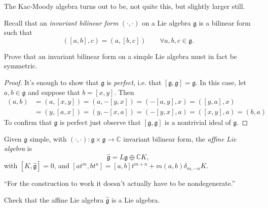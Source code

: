 The Kac-Moody algebra turns out to be, not quite this, but slightly larger
still.

Recall that an {\it invariant bilinear form} $(\cdot,\cdot)$ on a Lie algebra
$\mathfrak{g}$ is a bilinear form such that
\begin{equation}
\label{equation-invariant-bilinear-form}
([a,b],c)=(a,[b,c])\qquad \forall a,b,c \in \mathfrak{g}.
\end{equation}

\begin{exercise}
\label{exercise-invariant-bilinear-form-on-simple-Lie-algebra-is-symmetric}
Prove that an invariant bilinear form on a simple Lie algebra must in fact be
symmetric.
\end{exercise}

\begin{proof}
It's enough to show that $\mathfrak{g}$ is
{\it perfect}, i.e. that $[\mathfrak{g},\mathfrak{g}]=\mathfrak{g}$. In this
case, let $a,b \in \mathfrak{g}$ and suppose that $b=[x,y]$. Then
\begin{align*}
(a,b)&=(a,[x,y])=(a,-[y,x])=(-[a,y],x)=([y,a],x)\\
&=(y,[a,x])=(y,-[x,a])=(-[y,x],a)=([x,y],a)=(b,a)
\end{align*}
To confirm that $\mathfrak{g}$ is perfect just observe that
$[\mathfrak{g},\mathfrak{g}]$ is a nontrivial ideal of $\mathfrak{g}$.
\end{proof}

\begin{definition}
\label{definition-affine-Lie-algebra}
Given $\mathfrak{g}$ simple, with 
$(\cdot,\cdot):\mathfrak{g} \times \mathfrak{g} \to \mathbb{C}$ 
invariant bilinear form, the {\it affine Lie algebra} is 
$$
\hat{\mathfrak{g}}=L\mathfrak{g} \oplus \mathbb{C}K,
$$
with $[K,\hat{\mathfrak{g}}]=0$, and 
$[at^m,bt^n]=[a,b]t^{m+n}+m(a,b)\delta_{m,-n}K$.
\end{definition}

``For the construction to work it doesn't actually have to be nondegenerate.''

\begin{exercise}
\label{exercise-affine-Lie-algebra-is-Lie-algebra}
Check that the affine Lie algebra $\hat{\mathfrak{g}}$ is a Lie algebra.
\end{exercise}

